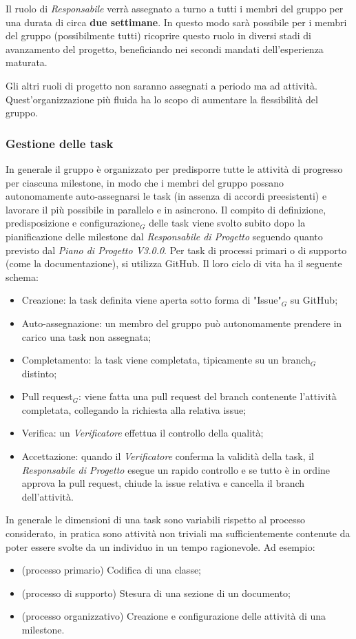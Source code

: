 Il ruolo di \textit{Responsabile} verrà assegnato a turno a tutti i membri del gruppo per una durata di circa \textbf{due settimane}. In questo modo sarà possibile per i membri del gruppo (possibilmente tutti) ricoprire questo ruolo in diversi stadi di avanzamento del progetto, beneficiando nei secondi mandati dell'esperienza maturata.

Gli altri ruoli di progetto non saranno assegnati a periodo ma ad attività. Quest'organizzazione più fluida ha lo scopo di aumentare la flessibilità del gruppo.

\subsubsection{Gestione delle task}
In generale il gruppo è organizzato per predisporre tutte le attività di progresso per ciascuna milestone, in modo che i membri del gruppo possano autonomamente auto-assegnarsi le task (in assenza di accordi preesistenti) e lavorare il più possibile in parallelo e in asincrono. Il compito di definizione, predisposizione e configurazione$_G$ delle task viene svolto subito dopo la pianificazione delle milestone dal \textit{Responsabile di Progetto} seguendo quanto previsto dal \textit{Piano di Progetto V3.0.0}.
Per task di processi primari o di supporto (come la documentazione), si utilizza GitHub. Il loro ciclo di vita ha il seguente schema:
\begin{itemize}
  \item Creazione: la task definita viene aperta sotto forma di "Issue"$_G$ su GitHub;
  \item Auto-assegnazione: un membro del gruppo può autonomamente prendere in carico una task non assegnata;
  \item Completamento: la task viene completata, tipicamente su un branch$_G$ distinto;
  \item Pull request$_G$: viene fatta una pull request del branch contenente l'attività completata, collegando la richiesta alla relativa issue;
  \item Verifica: un \textit{Verificatore} effettua il controllo della qualità;
  \item Accettazione: quando il \textit{Verificatore} conferma la validità della task, il \textit{Responsabile di Progetto} esegue un rapido controllo e se tutto è in ordine approva la pull request, chiude la issue relativa e cancella il branch dell'attività.
\end{itemize}

In generale le dimensioni di una task sono variabili rispetto al processo considerato, in pratica sono attività non triviali ma sufficientemente contenute da poter essere svolte da un individuo in un tempo ragionevole. Ad esempio:
\begin{itemize}
  \item (processo primario) Codifica di una classe;
  \item (processo di supporto) Stesura di una sezione di un documento;
  \item (processo organizzativo) Creazione e configurazione delle attività di una milestone.
\end{itemize}

